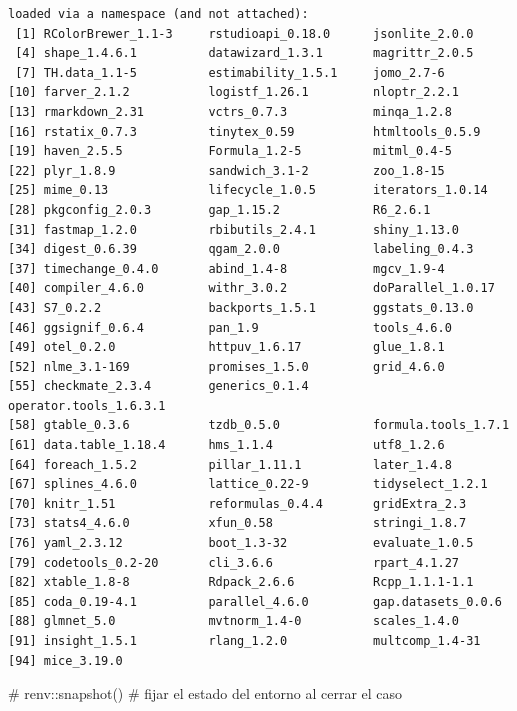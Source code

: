 \documentclass[
  letterpaper,
  DIV=11,
  numbers=noendperiod]{scrartcl}
\newenvironment{Shaded}{\begin{snugshade}}{\end{snugshade}}
\newcommand{\CommentTok}[1]{\textcolor[rgb]{0.37,0.37,0.37}{#1}}
\begin{document}
\begin{verbatim}
loaded via a namespace (and not attached):
 [1] RColorBrewer_1.1-3     rstudioapi_0.18.0      jsonlite_2.0.0        
 [4] shape_1.4.6.1          datawizard_1.3.1       magrittr_2.0.5        
 [7] TH.data_1.1-5          estimability_1.5.1     jomo_2.7-6            
[10] farver_2.1.2           logistf_1.26.1         nloptr_2.2.1          
[13] rmarkdown_2.31         vctrs_0.7.3            minqa_1.2.8           
[16] rstatix_0.7.3          tinytex_0.59           htmltools_0.5.9       
[19] haven_2.5.5            Formula_1.2-5          mitml_0.4-5           
[22] plyr_1.8.9             sandwich_3.1-2         zoo_1.8-15            
[25] mime_0.13              lifecycle_1.0.5        iterators_1.0.14      
[28] pkgconfig_2.0.3        gap_1.15.2             R6_2.6.1              
[31] fastmap_1.2.0          rbibutils_2.4.1        shiny_1.13.0          
[34] digest_0.6.39          qgam_2.0.0             labeling_0.4.3        
[37] timechange_0.4.0       abind_1.4-8            mgcv_1.9-4            
[40] compiler_4.6.0         withr_3.0.2            doParallel_1.0.17     
[43] S7_0.2.2               backports_1.5.1        ggstats_0.13.0        
[46] ggsignif_0.6.4         pan_1.9                tools_4.6.0           
[49] otel_0.2.0             httpuv_1.6.17          glue_1.8.1            
[52] nlme_3.1-169           promises_1.5.0         grid_4.6.0            
[55] checkmate_2.3.4        generics_0.1.4         operator.tools_1.6.3.1
[58] gtable_0.3.6           tzdb_0.5.0             formula.tools_1.7.1   
[61] data.table_1.18.4      hms_1.1.4              utf8_1.2.6            
[64] foreach_1.5.2          pillar_1.11.1          later_1.4.8           
[67] splines_4.6.0          lattice_0.22-9         tidyselect_1.2.1      
[70] knitr_1.51             reformulas_0.4.4       gridExtra_2.3         
[73] stats4_4.6.0           xfun_0.58              stringi_1.8.7         
[76] yaml_2.3.12            boot_1.3-32            evaluate_1.0.5        
[79] codetools_0.2-20       cli_3.6.6              rpart_4.1.27          
[82] xtable_1.8-8           Rdpack_2.6.6           Rcpp_1.1.1-1.1        
[85] coda_0.19-4.1          parallel_4.6.0         gap.datasets_0.0.6    
[88] glmnet_5.0             mvtnorm_1.4-0          scales_1.4.0          
[91] insight_1.5.1          rlang_1.2.0            multcomp_1.4-31       
[94] mice_3.19.0           
\end{verbatim}

\begin{Shaded}
\begin{Highlighting}[]
\CommentTok{\# renv::snapshot()   \# fijar el estado del entorno al cerrar el caso}
\end{Highlighting}
\end{Shaded}
\end{document}
